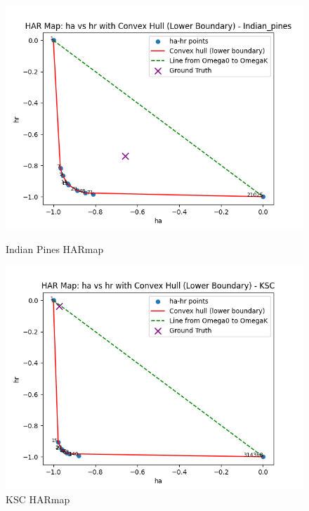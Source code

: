 
\begin{figure}[htbp]
    \centering
    \begin{minipage}{0.45\textwidth}
        \centering
        \includegraphics[width=\linewidth]{figures/Indian_pines_HARmap.png}
        \caption{Indian Pines HARmap}
        \label{fig:indian_pines_har}
    \end{minipage}\hfill
    \begin{minipage}{0.45\textwidth}
        \centering
        \includegraphics[width=\linewidth]{figures/KSC_HARmap.png}
        \caption{KSC HARmap}
        \label{fig:ksc_har}
    \end{minipage}
\end{figure}

